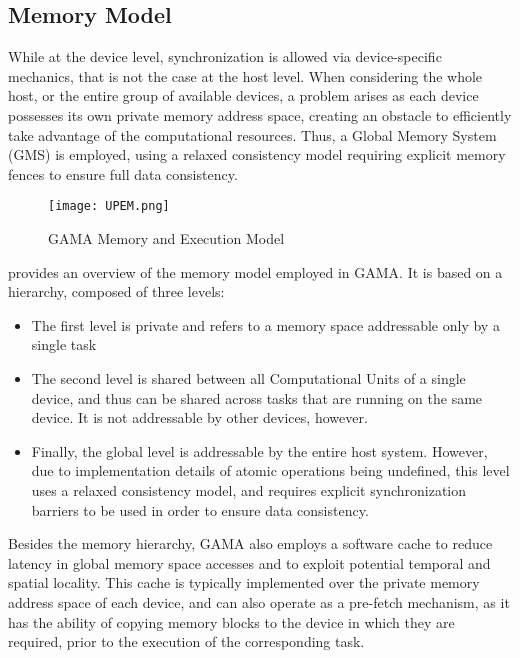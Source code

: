 \subsection{Memory Model}

While at the device level, synchronization is allowed via device-specific mechanics, that is not the case at the host level. When considering the whole host, or the entire group of available devices, a problem arises as each device possesses its own private memory address space, creating an obstacle to efficiently take advantage of the computational resources. Thus, a Global Memory System (GMS) is employed, using a relaxed consistency model requiring explicit memory fences to ensure full data consistency. 

\begin{figure}[!htp]
  \centering
  \texttt{[image: UPEM.png]}
  \caption{GAMA Memory and Execution Model}
  \label{fig:upem}
\end{figure}

 provides an overview of the memory model employed in GAMA. It is based on a hierarchy, composed of three levels:
\begin{itemize}
  \item The first level is private and refers to a memory space addressable only by a single task
  \item The second level is shared between all Computational Units of a single device, and thus can be shared across tasks that are running on the same device. It is not addressable by other devices, however.
  \item Finally, the global level is addressable by the entire host system. However, due to implementation details of atomic operations being undefined, this level uses a relaxed consistency model, and requires explicit synchronization barriers to be used in order to ensure data consistency. 
\end{itemize}

Besides the memory hierarchy, GAMA also employs a software cache to reduce latency in global memory space accesses and to exploit potential temporal and spatial locality. This cache is typically implemented over the private memory address space of each device, and can also operate as a pre-fetch mechanism, as it has the ability of copying memory blocks to the device in which they are required, prior to the execution of the corresponding task.
